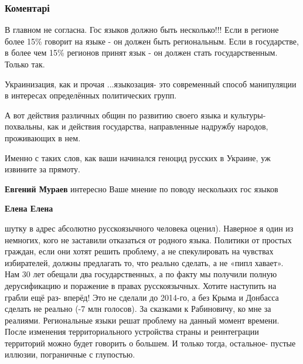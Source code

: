 
 
 
 
 
\subsubsection{Коментарі}

\begin{itemize} %

В главном не согласна. Гос языков должно быть несколько!!! Если в регионе более
15\% говорит на языке - он должен быть региональным. Если в государстве, в более
чем 15\% регионов принят язык - он должен стать государственным. Только так.

Украинизация, как и прочая ...языкозация- это современный способ манипуляции в
интересах определённых политических групп.

А вот действия различных общин по развитию своего языка и культуры- похвальны,
как и действия государства, направленные надружбу народов, проживающих в нем.

Именно с таких слов, как ваши начинался геноцид русских в Украине, уж извините
за прямоту.

\begin{itemize} %
\textbf{Евгений Мураев} интересно Ваше мнение по поводу нескольких гос языков

\textbf{Елена Елена} 

шутку в адрес абсолютно русскоязычного человека оценил). Наверное я один из
немногих, кого не заставили отказаться от родного языка. Политики от простых
граждан, если они хотят решить проблему, а не спекулировать на чувствах
избирателей, должны предлагать то, что реально сделать, а не «пипл хавает». Нам
30 лет обещали два государственных, а по факту мы получили полную дерусификацию
и поражение в правах русскоязычных. Хотите наступить на грабли ещё раз- вперёд!
Это не сделали до 2014-го, а без Крыма и Донбасса сделать не реально (-7 млн
голосов). За сказками к Рабиновичу, ко мне за реалиями. Региональные языки
решат проблему на данный момент времени. После изменения территориального
устройства страны и реинтеграции территорий можно будет говорить о большем. И
только тогда, остальное- пустые иллюзии, пограничные с глупостью.


\end{itemize}
\end{itemize}

